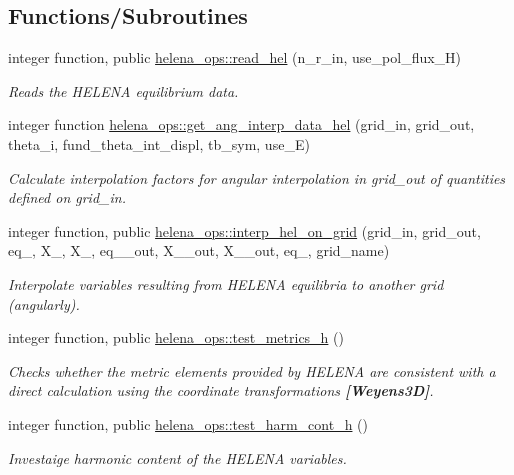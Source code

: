 \subsection*{Functions/\+Subroutines}
\begin{DoxyCompactItemize}
\item 
integer function, public \hyperlink{namespacehelena__ops_a6f32b23b060a66791d363dd78617134f}{helena\+\_\+ops\+::read\+\_\+hel} (n\+\_\+r\+\_\+in, use\+\_\+pol\+\_\+flux\+\_\+H)
\begin{DoxyCompactList}\small\item\em Reads the H\+E\+L\+E\+NA equilibrium data. \end{DoxyCompactList}\item 
integer function \hyperlink{namespacehelena__ops_ab1329afe5af2ff92d96f4be15a096b38}{helena\+\_\+ops\+::get\+\_\+ang\+\_\+interp\+\_\+data\+\_\+hel} (grid\+\_\+in, grid\+\_\+out, theta\+\_\+i, fund\+\_\+theta\+\_\+int\+\_\+displ, tb\+\_\+sym, use\+\_\+E)
\begin{DoxyCompactList}\small\item\em Calculate interpolation factors for angular interpolation in {\ttfamily grid\+\_\+out} of quantities defined on {\ttfamily grid\+\_\+in}. \end{DoxyCompactList}\item 
integer function, public \hyperlink{namespacehelena__ops_ad4fa02f03964facd44c529454665be22}{helena\+\_\+ops\+::interp\+\_\+hel\+\_\+on\+\_\+grid} (grid\+\_\+in, grid\+\_\+out, eq\+\_, X\+\_, X\+\_, eq\+\_\+\_\+out, X\+\_\+\_\+out, X\+\_\+\_\+out, eq\+\_, grid\+\_\+name)
\begin{DoxyCompactList}\small\item\em Interpolate variables resulting from H\+E\+L\+E\+NA equilibria to another grid (angularly). \end{DoxyCompactList}\item 
integer function, public \hyperlink{namespacehelena__ops_ae4237a1dea16db3eaf4b507700aeb00c}{helena\+\_\+ops\+::test\+\_\+metrics\+\_\+h} ()
\begin{DoxyCompactList}\small\item\em Checks whether the metric elements provided by H\+E\+L\+E\+NA are consistent with a direct calculation using the coordinate transformations {\bfseries [Weyens3D]}. \end{DoxyCompactList}\item 
integer function, public \hyperlink{namespacehelena__ops_a006acfac76ab1e057ac790fbc9484877}{helena\+\_\+ops\+::test\+\_\+harm\+\_\+cont\+\_\+h} ()
\begin{DoxyCompactList}\small\item\em Investaige harmonic content of the H\+E\+L\+E\+NA variables. \end{DoxyCompactList}\end{DoxyCompactItemize}
